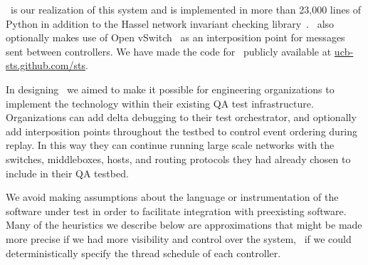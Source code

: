 
\projectname~is our realization of this system and is implemented in more than 23,000 lines of Python in
addition to the Hassel network invariant checking library~\cite{hsa}.
\projectname~also optionally makes use of Open vSwitch~\cite{pfaff2009extending} as an interposition point for
messages sent between controllers. We have
made the code for \projectname~publicly available at \href{http://ucb-sts.github.com/sts}{ucb-sts.github.com/sts}.

 In designing \projectname~we aimed to make
it possible for engineering organizations to
implement the technology within their existing QA test infrastructure.
Organizations can add delta debugging to their test
orchestrator, and optionally add interposition points throughout the
testbed to control event ordering during replay.
In this way they can continue running large scale networks with
the switches, middleboxes, hosts, and routing protocols they had already
chosen to include in their QA testbed.

We avoid making assumptions about the language or instrumentation of the
software under test in order to facilitate integration with preexisting software. Many of the heuristics we describe below are
approximations that might be made more precise if we had more visibility and
control over the system, \eg~if we could deterministically specify the thread schedule of each
controller.



